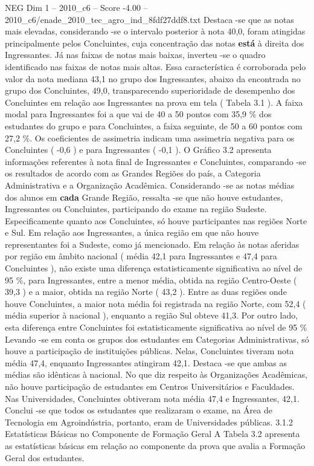 \begin{textsample}{NEG Dim 1 – 2010\_c6 – Score -4.00 – 2010\_c6/enade\_2010\_tec\_agro\_ind\_8fdf27ddf8.txt}
Destaca -se que as notas mais elevadas, considerando -se o intervalo posterior à nota 40,0, foram atingidas principalmente pelos Concluintes, cuja concentração das notas \textbf{está} à direita dos Ingressantes.
Já nas faixas de notas mais baixas, inverteu -se o quadro identificado nas faixas de notas mais altas.
Essa característica é corroborada pelo valor da nota mediana 43,1 no grupo dos Ingressantes, abaixo da encontrada no grupo dos Concluintes, 49,0, transparecendo superioridade de desempenho dos Concluintes em relação aos Ingressantes na prova em tela ( Tabela 3.1 ).
A faixa modal para Ingressantes foi a que vai de 40 a 50 pontos com 35,9 \% dos estudantes do grupo e para Concluintes, a faixa seguinte, de 50 a 60 pontos com 27,2 \%.
Os coeficientes de assimetria indicam uma assimetria negativa para os Concluintes ( -0,6 ) e para Ingressantes ( -0,1 ).
O Gráfico 3.2 apresenta informações referentes à nota final de Ingressantes e Concluintes, comparando -se os resultados de acordo com as Grandes Regiões do país, a Categoria Administrativa e a Organização Acadêmica.
Considerando -se as notas médias dos alunos em \textbf{cada} Grande Região, ressalta -se que não houve estudantes, Ingressantes ou Concluintes, participando do exame na região Sudeste.
Especificamente quanto aos Concluintes, só houve participantes nas regiões Norte e Sul.
Em relação aos Ingressantes, a única região em que não houve representantes foi a Sudeste, como já mencionado.
Em relação às notas aferidas por região em âmbito nacional ( média 42,1 para Ingressantes e 47,4 para Concluintes ), não existe uma diferença estatisticamente significativa ao nível de 95 \%, para Ingressantes, entre a menor média, obtida na região Centro-Oeste ( 39,3 ) e a maior, obtida na região Norte ( 43,2 ).
Entre as duas regiões onde houve Concluintes, a maior nota média foi registrada na região Norte, com 52,4 ( média superior à nacional ), enquanto a região Sul obteve 41,3.
Por outro lado, esta diferença entre Concluintes foi estatisticamente significativa ao nível de 95 \% Levando -se em conta os grupos dos estudantes em Categorias Administrativas, só houve a participação de instituições públicas.
Nelas, Concluintes tiveram nota média 47,4, enquanto Ingressantes atingiram 42,1.
Destaca -se que ambas as médias são idênticas à nacional.
No que diz respeito às Organizações Acadêmicas, não houve participação de estudantes em Centros Universitários e Faculdades.
Nas Universidades, Concluintes obtiveram nota média 47,4 e Ingressantes, 42,1.
Conclui -se que todos os estudantes que realizaram o exame, na Área de Tecnologia em Agroindústria, portanto, eram de Universidades públicas. 3.1.2 Estatísticas Básicas no Componente de Formação Geral A Tabela 3.2 apresenta as estatísticas básicas em relação ao componente da prova que avalia a Formação Geral dos estudantes.

\end{textsample}
